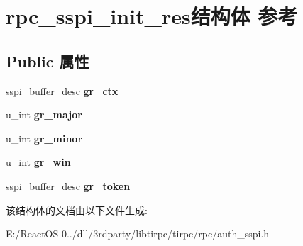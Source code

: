 \hypertarget{structrpc__sspi__init__res}{}\section{rpc\+\_\+sspi\+\_\+init\+\_\+res结构体 参考}
\label{structrpc__sspi__init__res}
\subsection*{Public 属性}
\begin{DoxyCompactItemize}
\item 
\mbox{\label{structrpc__sspi__init__res_a21d9057580e5cdeeeff5aa8db1465770}} 
\hyperlink{struct__sspi__buffer__desc}{sspi\+\_\+buffer\+\_\+desc} {\bfseries gr\+\_\+ctx}
\item 
\mbox{\label{structrpc__sspi__init__res_a8c329c529b488d4345c24a902d0bc62b}} 
u\+\_\+int {\bfseries gr\+\_\+major}
\item 
\mbox{\label{structrpc__sspi__init__res_ac3e5cccc2cb199cdd844ba876bfe8254}} 
u\+\_\+int {\bfseries gr\+\_\+minor}
\item 
\mbox{\label{structrpc__sspi__init__res_a264f398640061d64455bdef8cb32e736}} 
u\+\_\+int {\bfseries gr\+\_\+win}
\item 
\mbox{\label{structrpc__sspi__init__res_af9570f29006a1788ad2fe33ecfe63af2}} 
\hyperlink{struct__sspi__buffer__desc}{sspi\+\_\+buffer\+\_\+desc} {\bfseries gr\+\_\+token}
\end{DoxyCompactItemize}


该结构体的文档由以下文件生成\+:\begin{DoxyCompactItemize}
\item 
E\+:/\+React\+O\+S-\/0../dll/3rdparty/libtirpc/tirpc/rpc/auth\+\_\+sspi.\+h\end{DoxyCompactItemize}
